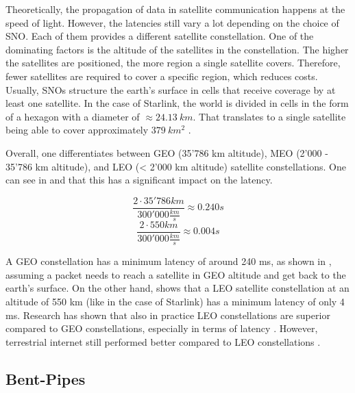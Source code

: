 Theoretically, the propagation of data in satellite communication happens at
the speed of light. However, the latencies still vary a lot depending on the
choice of \ac{SNO}. Each of them provides a different satellite constellation.
One of the dominating factors is the altitude of the satellites in the
constellation. The higher the satellites are positioned, the more region a
single satellite covers. Therefore, fewer satellites are required to cover a
specific region, which reduces costs. Usually, \ac{SNO}s structure the earth's
surface in cells that receive coverage by at least one satellite. In the case
of Starlink, the world is divided in cells in the form of a hexagon with a
diameter of $\approx 24.13~km$. That translates to a single satellite being
able to cover approximately $379~km^2$ \cite{Pekhterev2021}.

Overall, one differentiates between \ac{GEO} (35'786 km altitude), \ac{MEO}
(2'000 - 35'786 km altitude), and \ac{LEO} (< 2'000 km altitude) satellite
constellations. One can see in  and
 that this has a significant impact on the
latency.

\begin{equation}
	\frac{2 \cdot 35'786 km}{300'000 \frac{km}{s}} \approx 0.240 s
	\label{eq:geo-min-latency}
\end{equation}
\begin{equation}
	\frac{2 \cdot 550 km}{300'000 \frac{km}{s}} \approx 0.004 s
	\label{eq:starlink-min-latency}
\end{equation}

A \ac{GEO} constellation has a minimum latency of around 240 ms, as shown in
, assuming a packet needs to reach a satellite in
\ac{GEO} altitude and get back to the earth's surface. On the other hand,
 shows that a \ac{LEO} satellite constellation at
an altitude of 550 km (like in the case of Starlink) has a minimum latency of
only 4 ms. Research has shown that also in practice \ac{LEO} constellations are
superior compared to \ac{GEO} constellations, especially in terms of latency
\cite{DBLP:journals/pacmnet/RamanVCSZ23, Segan2020}. However, terrestrial
internet still performed better compared to \ac{LEO} constellations
\cite{DBLP:conf/www/MohanFCBRMO24, DBLP:conf/infocom/MaCZCML23}.

\subsection{Bent-Pipes} \label{sec:bent-pipes}

